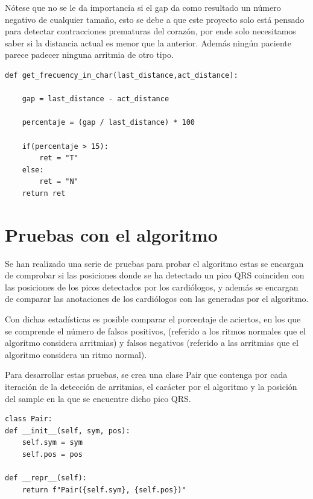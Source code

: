 Nótese que no se le da importancia si el gap da como resultado un número negativo de cualquier tamaño, esto se debe
a que este proyecto solo está pensado para detectar contracciones prematuras del corazón, por ende solo necesitamos 
saber si la distancia actual es menor que la anterior. Además ningún paciente parece padecer ninguna arritmia de otro
tipo.

\lstset{language=python, breaklines=true, basicstyle=\footnotesize}
\begin{lstlisting}[frame=single]
def get_frecuency_in_char(last_distance,act_distance): 

    gap = last_distance - act_distance

    percentaje = (gap / last_distance) * 100

    if(percentaje > 15):
        ret = "T"
    else:
        ret = "N"
    return ret

\end{lstlisting}

\section{Pruebas con el algoritmo}

Se han realizado una serie de pruebas para probar el algoritmo estas se encargan de comprobar si las posiciones donde
se ha detectado un pico QRS coinciden con las posiciones de los picos detectados por los cardiólogos, y además se 
encargan de comparar las anotaciones de los cardiólogos con las generadas por el algoritmo.

Con dichas estadísticas es posible comparar el porcentaje de aciertos, en los que se comprende el número de 
falsos positivos, (referido a los ritmos normales que el algoritmo considera arritmias) y 
falsos negativos (referido a las arritmias que el algoritmo considera un ritmo normal).

Para desarrollar estas pruebas, se crea una clase Pair que contenga por cada iteración de la detección de arritmias, el carácter 
por el algoritmo y la posición del sample en la que se encuentre dicho pico QRS.
\newpage
\lstset{language=python, breaklines=true, basicstyle=\footnotesize}
\begin{lstlisting}[frame=single]
class Pair:
def __init__(self, sym, pos):
    self.sym = sym
    self.pos = pos

def __repr__(self):
    return f"Pair({self.sym}, {self.pos})"

\end{lstlisting}

